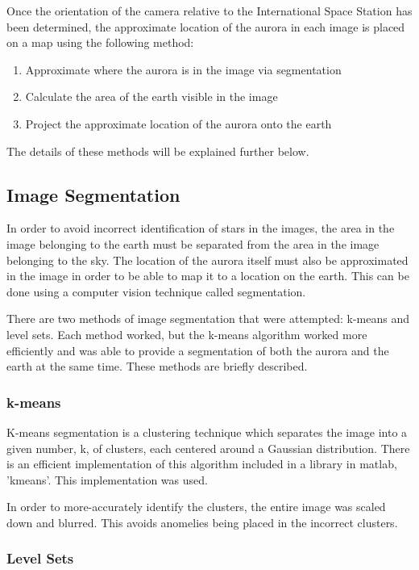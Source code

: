 \documentclass[onecolumn,preprintnumbers,amsmath,amssymb]{revtex4}
\begin{document}
Once the orientation of the camera relative to the International Space Station has been determined, the approximate location of the aurora in each image is placed on a map using the following method:
\begin{enumerate}
\item Approximate where the aurora is in the image via segmentation
\item Calculate the area of the earth visible in the image
\item Project the approximate location of the aurora onto the earth
\end{enumerate}

The details of these methods will be explained further below. 

\subsection{ \bf Image Segmentation }

In order to avoid incorrect identification of stars in the images, the area in the image belonging to the earth must be separated from the area in the image belonging to the sky.  The location of the aurora itself must also be approximated in the image in order to be able to map it to a location on the earth.  This can be done using a computer vision technique called segmentation.

There are two methods of image segmentation that were attempted: k-means and level sets.  Each method worked, but the k-means algorithm worked more efficiently and was able to provide a segmentation of both the aurora and the earth at the same time.  These methods are briefly described.

\subsubsection{ \bf k-means }

K-means segmentation is a clustering technique which separates the image into a given number, k, of clusters, each centered around a Gaussian distribution.  There is an efficient implementation of this algorithm included in a library in matlab, 'kmeans'.  This implementation was used.

In order to more-accurately identify the clusters, the entire image was scaled down and blurred.  This avoids anomelies being placed in the incorrect clusters.

\subsubsection{ \bf Level Sets }
\end{document}
